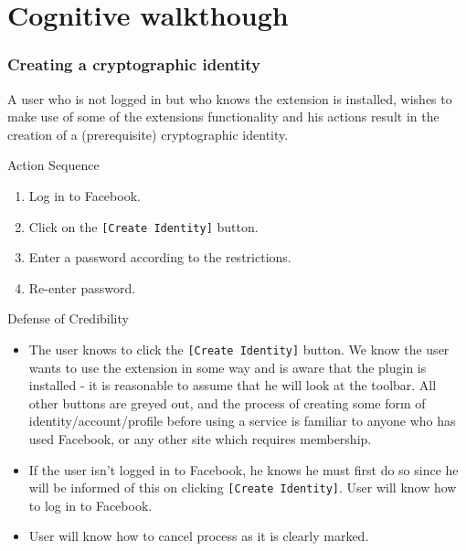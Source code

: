 \chapter{Cognitive walkthough}


\subsection{Creating a cryptographic identity}
A user who is not logged in but who knows the extension is installed, wishes to make use of some of the extensions functionality and his actions result in the creation of a (prerequisite) cryptographic identity.

\begin{desc}

    \item[Action Sequence] \hfill
    
    \begin{enumerate}
        \item Log in to Facebook.
        \item Click on the {\tt [Create Identity]} button.
        \item Enter a password according to the restrictions.
        \item Re-enter password.
    \end{enumerate}
    
    \item[Defense of Credibility] \hfill
        \begin{itemize}
            
            \item The user knows to click the {\tt [Create Identity]} button. We know the user wants to use the extension in some way and is aware that the plugin is installed - it is reasonable to assume that he will look at the toolbar. All other buttons are greyed out, and the process of creating some form of identity/account/profile before using a service is familiar to anyone who has used Facebook, or any other site which requires membership.
            
            \item If the user isn't logged in to Facebook, he knows he must first do so since he will be informed of this on clicking {\tt [Create Identity]}. User will know how to log in to Facebook.
            
            \item User will know how to cancel process as it is clearly marked.
            

\end{itemize}
\end{desc}
